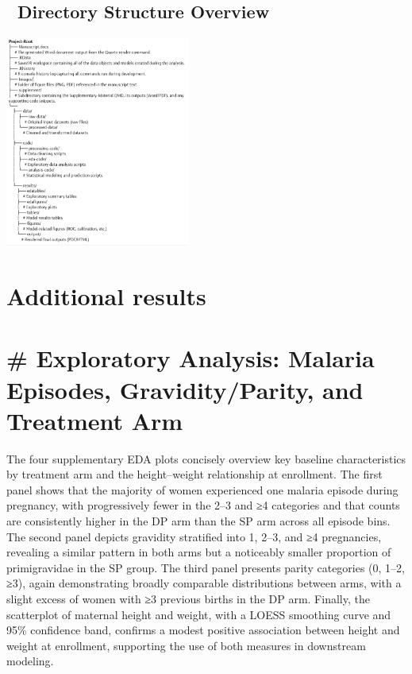 \documentclass[
  letterpaper,
  DIV=11,
  numbers=noendperiod]{scrartcl}
\begin{document}
\subsection{📁 Directory Structure
Overview}\label{directory-structure-overview}

\includegraphics[width=2.39in,height=\textheight,keepaspectratio]{../Images/Project-root.png}

\newpage{}

\section{Additional results}\label{additional-results}

\section{\# Exploratory Analysis: Malaria Episodes, Gravidity/Parity,
and Treatment
Arm}\label{exploratory-analysis-malaria-episodes-gravidityparity-and-treatment-arm}

The four supplementary EDA plots concisely overview key baseline
characteristics by treatment arm and the height--weight relationship at
enrollment. The first panel shows that the majority of women experienced
one malaria episode during pregnancy, with progressively fewer in the
2--3 and ≥4 categories and that counts are consistently higher in the DP
arm than the SP arm across all episode bins. The second panel depicts
gravidity stratified into 1, 2--3, and ≥4 pregnancies, revealing a
similar pattern in both arms but a noticeably smaller proportion of
primigravidae in the SP group. The third panel presents parity
categories (0, 1--2, ≥3), again demonstrating broadly comparable
distributions between arms, with a slight excess of women with ≥3
previous births in the DP arm. Finally, the scatterplot of maternal
height and weight, with a LOESS smoothing curve and 95\% confidence
band, confirms a modest positive association between height and weight
at enrollment, supporting the use of both measures in downstream
modeling.
\end{document}
